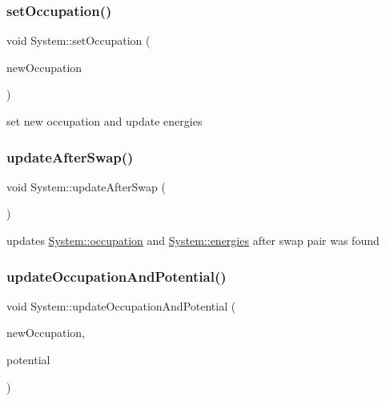 \subsubsection{\texorpdfstring{set\+Occupation()}{setOccupation()}}
{\footnotesize\ttfamily void System\+::set\+Occupation (\begin{DoxyParamCaption}\item[{std\+::vector$<$ bool $>$ const \&}]{new\+Occupation }\end{DoxyParamCaption})\hspace{0.3cm}{\ttfamily [private]}}

set new occupation and update energies \mbox{\label{classSystem_ad32d6fd369f822d075e19698f8e6a2ae}} 
\subsubsection{\texorpdfstring{update\+After\+Swap()}{updateAfterSwap()}}
{\footnotesize\ttfamily void System\+::update\+After\+Swap (\begin{DoxyParamCaption}{ }\end{DoxyParamCaption})\hspace{0.3cm}{\ttfamily [private]}}

updates \hyperlink{classSystem_af13aaae75d6cff51d202b004a9fdc3d4}{System\+::occupation} and \hyperlink{classSystem_aee5f3f70dcfa30875997d09e2a077dce}{System\+::energies} after swap pair was found \mbox{\label{classSystem_adabb9bdb6516b565f63345ea74a10de7}} 
\subsubsection{\texorpdfstring{update\+Occupation\+And\+Potential()}{updateOccupationAndPotential()}}
{\footnotesize\ttfamily void System\+::update\+Occupation\+And\+Potential (\begin{DoxyParamCaption}\item[{std\+::vector$<$ bool $>$ const \&}]{new\+Occupation,  }\item[{mfem\+::\+Grid\+Function const \&}]{potential }\end{DoxyParamCaption})}

